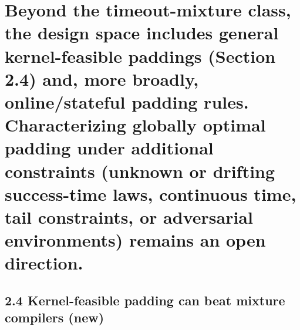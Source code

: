 \documentclass[11pt]{article}
\begin{document}
\hypertarget{beyond-the-timeout-mixture-class-the-design-space-includes-general-kernel-feasible-paddings-section-2.4-and-more-broadly-onlinestateful-padding-rules.-characterizing-globally-optimal-padding-under-additional-constraints-unknown-or-drifting-success-time-laws-continuous-time-tail-constraints-or-adversarial-environments-remains-an-open-direction.}{%
\section{Beyond the timeout-mixture class, the design space includes
general kernel-feasible paddings (Section 2.4) and, more broadly,
online/stateful padding rules. Characterizing globally optimal padding
under additional constraints (unknown or drifting success-time laws,
continuous time, tail constraints, or adversarial environments) remains
an open
direction.}\label{beyond-the-timeout-mixture-class-the-design-space-includes-general-kernel-feasible-paddings-section-2.4-and-more-broadly-onlinestateful-padding-rules.-characterizing-globally-optimal-padding-under-additional-constraints-unknown-or-drifting-success-time-laws-continuous-time-tail-constraints-or-adversarial-environments-remains-an-open-direction.}}

\hypertarget{kernel-feasible-padding-can-beat-mixture-compilers-new}{%
\subsection{2.4 Kernel-feasible padding can beat mixture compilers
(new)}\label{kernel-feasible-padding-can-beat-mixture-compilers-new}}
\end{document}
